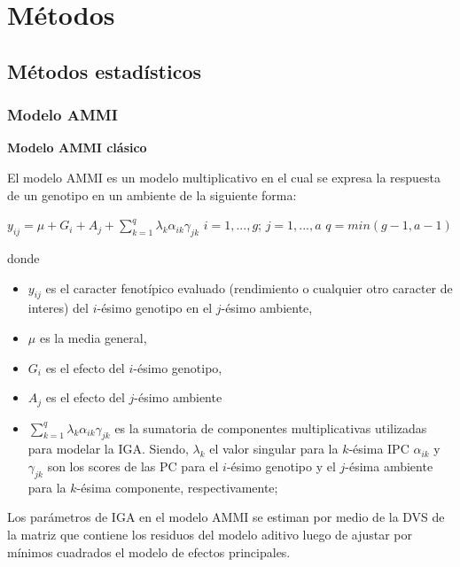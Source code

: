 
\chapter{Métodos}
\section{Métodos estadísticos}

\subsection{Modelo AMMI}

\textbf{Modelo AMMI clásico}

El modelo AMMI es un modelo multiplicativo en el cual se expresa la respuesta de un genotipo en un ambiente de la siguiente forma:
\begin{center}
$y_{ij}= \mu +G_i + A_j + \sum_{k=1}^q \lambda_k \alpha_{ik} \gamma_{jk}$ \vspace{1cm} $ i=1,...,g$; $ j=1,...,a$ $q=min(g-1,a-1)$
\end{center}
donde 
\begin{itemize}
\item $y_{ij}$ es el caracter fenotípico evaluado (rendimiento o cualquier otro caracter de interes) del $i$-ésimo genotipo en el $j$-ésimo ambiente,
\item $\mu$ es la media general,
\item  $G_i$ es el efecto del $i$-ésimo genotipo,
\item $A_j$ es el efecto del $j$-ésimo ambiente
\item $\sum_{k=1}^q \lambda_k \alpha_{ik} \gamma_{jk}$ es la sumatoria de componentes multiplicativas utilizadas para modelar la IGA. Siendo, $\lambda_k$ el valor singular para la  $k$-ésima IPC $\alpha_{ik}$ y $\gamma_{jk}$ son los scores de las PC para el $i$-ésimo genotipo y el $j$-ésima ambiente para la $k$-ésima componente, respectivamente;
\end{itemize}

Los parámetros de IGA en el modelo AMMI se estiman por medio de la DVS de la matriz que contiene los residuos del modelo aditivo luego de ajustar por mínimos cuadrados el modelo de efectos principales.

